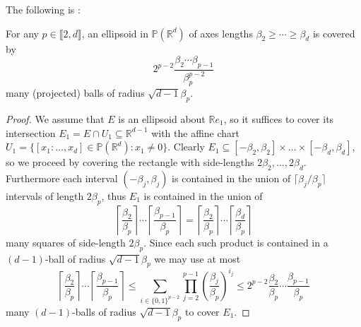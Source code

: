 \documentclass{report}
\begin{document}
The following is \cite[Lemma 3.7]{pozzetti_anosov_2023}:
\begin{lemma}\label{lem:ellipsoid_covering}
For any $p \in \llbracket 2, d \rrbracket$, an ellipsoid in $\mathbb P(\mathbb R^d)$ of axes lengths $\beta_2 \geq \cdots \geq \beta_d$ is covered by
\[
    2^{p - 2} \frac{\beta_2 \cdots \beta_{p-1}}{\beta_p^{p-2}}
\]
many (projected) balls of radius $\sqrt{d-1} \beta_p$.
\end{lemma}
\begin{proof}
We assume that $E$ is an ellipsoid about $\mathbb R e_1$, so it suffices to cover its intersection $E_1 = E \cap U_1 \subseteq \mathbb R^{d-1}$ with the affine chart $U_1 = \{ [x_1: \ldots, x_d ] \in \mathbb P(\mathbb R^d) : x_1 \neq 0 \}$.
Clearly $E_1 \subseteq [-\beta_2, \beta_2] \times \ldots \times [-\beta_d, \beta_d]$, so we proceed by covering the rectangle with side-lengths $2\beta_2, \ldots, 2\beta_d$.
Furthermore each interval $(-\beta_j, \beta_j)$ is contained in the union of $\lceil \beta_j/\beta_p \rceil$ intervals of length $2\beta_p$, thus $E_1$ is contained in the union of
\[
    \left\lceil \frac{\beta_2}{\beta_p} \right\rceil \cdots \left\lceil \frac{\beta_{p-1}}{\beta_p} \right\rceil =
    \left\lceil \frac{\beta_2}{\beta_p} \right\rceil \cdots \left\lceil \frac{\beta_d}{\beta_p} \right\rceil
\]
many squares of side-length $2\beta_p$.
Since each such product is contained in a $(d-1)$-ball of radius $\sqrt{d-1} \beta_p$ we may use at most
\[
    \left\lceil \frac{\beta_2}{\beta_p} \right\rceil \cdots \left\lceil \frac{\beta_{p-1}}{\beta_p} \right\rceil \leq
    \sum_{i \in \{ 0,1 \}^{p-2} } \prod_{j = 2}^{p-1} \left( \frac{\beta_j}{\beta_p} \right)^{i_j} \leq 2^{p-2} \frac{\beta_2}{\beta_p} \cdots \frac{\beta_{p-1}}{\beta_p}
\]
many $(d-1)$-balls of radius $\sqrt{d-1}\beta_p$ to cover $E_1$.
\end{proof}
\end{document}
